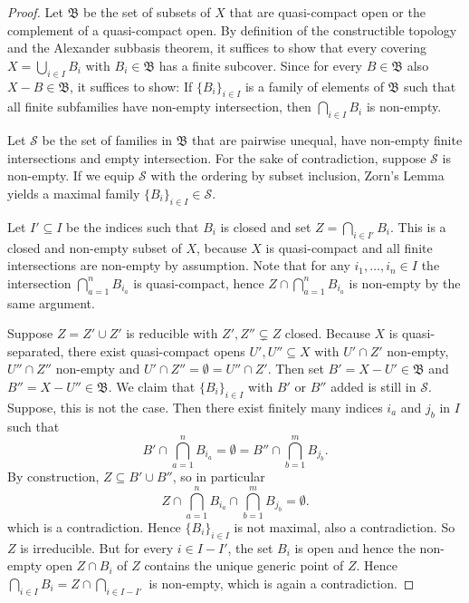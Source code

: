\begin{proof}
    Let $\mathfrak{B}$ be the set of subsets of $X$ that are quasi-compact open or
    the complement of a quasi-compact open.
    By definition of the constructible topology and the Alexander subbasis theorem,
    it suffices to show that every covering $X = \bigcup_{i \in  I} B_i$
    with $B_i \in \mathfrak{B}$ has a finite subcover. Since
    for every $B \in \mathfrak{B}$ also $X - B \in \mathfrak{B}$,
    it suffices to show: If $\{B_i\}_{i \in I}$ is a family of elements
    of $\mathfrak{B}$ such that all finite subfamilies have non-empty intersection,
    then $\bigcap_{i \in  I} B_i$ is non-empty.

    Let $\mathcal{S}$ be the set of families in $\mathfrak{B}$ that are pairwise unequal, have non-empty
    finite intersections and empty intersection. For the sake of contradiction, suppose
    $\mathcal{S}$ is non-empty. If we equip $\mathcal{S}$ with the ordering by subset inclusion,
    Zorn's Lemma yields a maximal family $\{B_i\}_{i \in I} \in \mathcal{S}$.

    Let $I' \subseteq I$ be the indices such that $B_i$ is closed and set $Z = \bigcap_{i \in  I'} B_i$.
    This is a closed and non-empty subset of $X$, because $X$ is quasi-compact
    and all finite intersections are non-empty by assumption.
    Note that for any $i_1, \ldots, i_n \in I$ the intersection $\bigcap_{a=1}^n B_{i_a}$ is quasi-compact,
    hence $Z \cap \bigcap_{a=1}^n B_{i_a}$ is non-empty by the same argument.

    Suppose $Z = Z' \cup Z'$ is reducible with $Z', Z'' \subsetneq Z$ closed. Because
    $X$ is quasi-separated, there exist quasi-compact opens $U', U'' \subseteq X$ with
    $U' \cap Z'$ non-empty, $U'' \cap Z''$ non-empty and $U' \cap Z'' = \emptyset = U'' \cap Z'$.
    Then set $B' = X - U' \in \mathfrak{B}$ and $B'' = X - U'' \in \mathfrak{B}$. We
    claim that $\{B_i\}_{i \in I}$ with $B'$ or $B''$ added is still in $\mathcal{S}$. Suppose,
    this is not the case. Then there exist finitely many indices
    $i_a$ and $j_b$ in $I$ such that
    \[
    B' \cap \bigcap_{a=1}^n B_{i_a} = \emptyset = B'' \cap \bigcap_{b=1}^m B_{j_b}
    .\] By construction, $Z \subseteq B' \cup B''$, so in particular
    \[
    Z \cap \bigcap_{a=1}^n B_{i_a} \cap \bigcap_{b=1}^m B_{j_b} = \emptyset
    .\] which is a contradiction. Hence $\{B_i\}_{i \in I}$ is not maximal, also a contradiction. So
    $Z$ is irreducible. But for every $i \in I - I'$, the set $B_i$ is open and hence
    the non-empty open $Z \cap B_i$ of $Z$ contains the unique generic point of $Z$. Hence
    $\bigcap_{i \in  I} B_i = Z \cap \bigcap_{i \in  I - I'}$ is non-empty, which is again a contradiction.
\end{proof}

